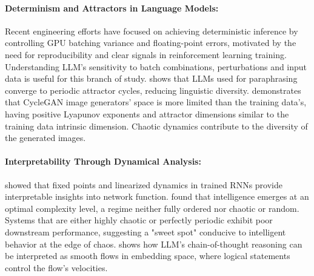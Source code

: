\documentclass[a4paper,12pt]{article}
\begin{document}
\paragraph{Determinism and Attractors in Language Models:}
Recent engineering efforts \cite{he2025nondeterminism} have focused on achieving deterministic inference by controlling GPU batching variance and floating-point errors, motivated by the need for reproducibility and clear signals in reinforcement learning training. Understanding LLM's sensitivity to batch combinations, perturbations and input data is useful for this branch of study.
\cite{wang2025unveiling_attractor_cycles} shows that LLMs used for paraphrasing converge to periodic attractor cycles, reducing linguistic diversity.
\cite{cyclegan} %
demonstrates that CycleGAN image generators' space is more limited than the training data's, having positive Lyapunov exponents and attractor dimensions similar to the training data intrinsic dimension. Chaotic dynamics contribute to the diversity of the generated images.

\paragraph{Interpretability Through Dynamical Analysis:}
\label{par:interpretability_dynamics}
\cite{sussillo2013} showed that fixed points and linearized dynamics in trained RNNs provide interpretable insights into network function. \cite{zhang2024intelligence_edge_of_chaos} found that intelligence emerges at an optimal complexity level, a regime neither fully ordered nor chaotic or random. Systems that are either highly chaotic or perfectly periodic exhibit poor downstream performance, suggesting a "sweet spot" conducive to intelligent behavior at the edge of chaos. \cite{zhou2025geometryreasoningflowinglogics} shows how LLM's chain-of-thought reasoning can be interpreted as smooth flows in embedding space, where logical statements control the flow's velocities.
\end{document}
